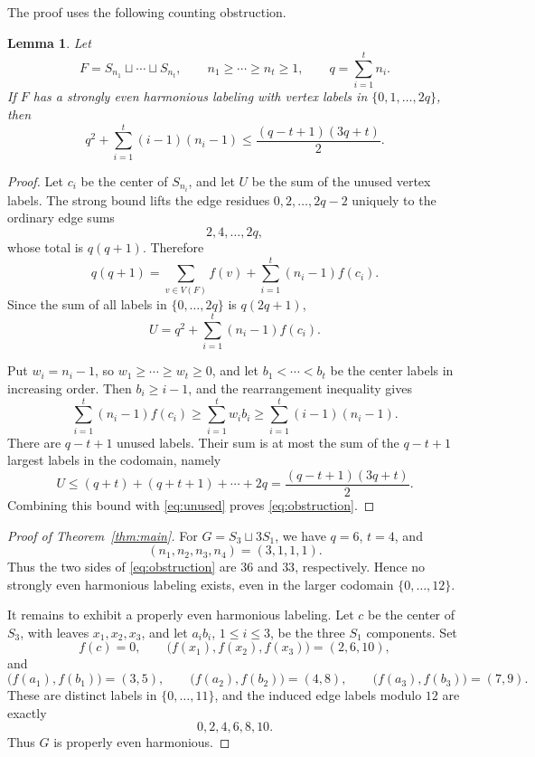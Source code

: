 \documentclass[11pt]{amsart}
\newtheorem{lemma}[theorem]{Lemma}
\theoremstyle{remark}
\begin{document}
The proof uses the following counting obstruction.

\begin{lemma}\label{lem:count}
Let
\[
 F=S_{n_1}\sqcup\cdots\sqcup S_{n_t},
 \qquad
 n_1\ge\cdots\ge n_t\ge1,
 \qquad
 q=\sum_{i=1}^t n_i.
\]
If $F$ has a strongly even harmonious labeling with vertex labels in
$\{0,1,\ldots,2q\}$, then
\begin{equation}\label{eq:obstruction}
 q^2+\sum_{i=1}^t(i-1)(n_i-1)
 \le
 \frac{(q-t+1)(3q+t)}{2}.
\end{equation}
\end{lemma}

\begin{proof}
Let $c_i$ be the center of $S_{n_i}$, and let $U$ be the sum of the
unused vertex labels. The strong bound lifts the edge residues
$0,2,\ldots,2q-2$ uniquely to the ordinary edge sums
\[
 2,4,\ldots,2q,
\]
whose total is $q(q+1)$. Therefore
\[
 q(q+1)
 =
 \sum_{v\in V(F)}f(v)
 +
 \sum_{i=1}^t(n_i-1)f(c_i).
\]
Since the sum of all labels in $\{0,\ldots,2q\}$ is $q(2q+1)$,
\begin{equation}\label{eq:unused}
 U=q^2+\sum_{i=1}^t(n_i-1)f(c_i).
\end{equation}

Put $w_i=n_i-1$, so $w_1\ge\cdots\ge w_t\ge0$, and let
$b_1<\cdots<b_t$ be the center labels in increasing order. Then
$b_i\ge i-1$, and the rearrangement inequality gives
\[
 \sum_{i=1}^t(n_i-1)f(c_i)
 \ge
 \sum_{i=1}^t w_i b_i
 \ge
 \sum_{i=1}^t(i-1)(n_i-1).
\]
There are $q-t+1$ unused labels. Their sum is at most the sum of the
$q-t+1$ largest labels in the codomain, namely
\[
 U
 \le
 (q+t)+(q+t+1)+\cdots+2q
 =
 \frac{(q-t+1)(3q+t)}{2}.
\]
Combining this bound with \eqref{eq:unused} proves
\eqref{eq:obstruction}.
\end{proof}

\begin{proof}[Proof of Theorem~\ref{thm:main}]
For $G=S_3\sqcup3S_1$, we have $q=6$, $t=4$, and
\[
 (n_1,n_2,n_3,n_4)=(3,1,1,1).
\]
Thus the two sides of \eqref{eq:obstruction} are $36$ and $33$,
respectively. Hence no strongly even harmonious labeling exists, even
in the larger codomain $\{0,\ldots,12\}$.

It remains to exhibit a properly even harmonious labeling. Let $c$ be
the center of $S_3$, with leaves $x_1,x_2,x_3$, and let $a_i b_i$,
$1\le i\le3$, be the three $S_1$ components. Set
\[
 f(c)=0,
 \qquad
 \bigl(f(x_1),f(x_2),f(x_3)\bigr)=(2,6,10),
\]
and
\[
 \bigl(f(a_1),f(b_1)\bigr)=(3,5),\qquad
 \bigl(f(a_2),f(b_2)\bigr)=(4,8),\qquad
 \bigl(f(a_3),f(b_3)\bigr)=(7,9).
\]
These are distinct labels in $\{0,\ldots,11\}$, and the induced edge
labels modulo $12$ are exactly
\[
 0,2,4,6,8,10.
\]
Thus $G$ is properly even harmonious.
\end{proof}
\end{document}
